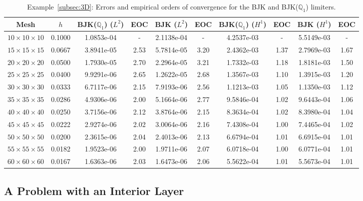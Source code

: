 \documentclass[a4paper]{article}
\theoremstyle{plain}
\theoremstyle{definition}
\theoremstyle{remark}
\begin{document}
\begin{table}[htbp]
	\centering
	\footnotesize
	\setlength{\tabcolsep}{3pt}
	\begin{tabular}{|c|c|c|c|c|c|c|c|c|c|}
		\hline
		Mesh & $h$ & BJK($ \mathbb{Q}_1 $) ($L^2$) & EOC & BJK ($L^2$) & EOC & BJK($ \mathbb{Q}_1 $) ($H^1$) & EOC & BJK ($H^1$) & EOC \\
		\hline
		$10\times10\times10$ & 0.1000 & 1.0853e-04 & -    & 2.1138e-04 & -    & 4.2537e-03 & -    & 5.5149e-03 & -    \\ \hline
		$15\times15\times15$ & 0.0667 & 3.8941e-05 & 2.53 & 5.7814e-05 & 3.20 & 2.4362e-03 & 1.37 & 2.7969e-03 & 1.67 \\ \hline
		$20\times20\times20$ & 0.0500 & 1.7930e-05 & 2.70 & 2.2964e-05 & 3.21 & 1.7332e-03 & 1.18 & 1.8181e-03 & 1.50 \\ \hline
		$25\times25\times25$ & 0.0400 & 9.9291e-06 & 2.65 & 1.2622e-05 & 2.68 & 1.3567e-03 & 1.10 & 1.3915e-03 & 1.20 \\ \hline
		$30\times30\times30$ & 0.0333 & 6.7117e-06 & 2.15 & 7.9193e-06 & 2.56 & 1.1213e-03 & 1.05 & 1.1350e-03 & 1.12 \\ \hline
		$35\times35\times35$ & 0.0286 & 4.9306e-06 & 2.00 & 5.1664e-06 & 2.77 & 9.5846e-04 & 1.02 & 9.6443e-04 & 1.06 \\ \hline
		$40\times40\times40$ & 0.0250 & 3.7156e-06 & 2.12 & 3.8764e-06 & 2.15 & 8.3634e-04 & 1.02 & 8.3980e-04 & 1.04 \\ \hline
		$45\times45\times45$ & 0.0222 & 2.9274e-06 & 2.02 & 3.0064e-06 & 2.16 & 7.4308e-04 & 1.00 & 7.4465e-04 & 1.02 \\ \hline
		$50\times50\times50$ & 0.0200 & 2.3615e-06 & 2.04 & 2.4013e-06 & 2.13 & 6.6794e-04 & 1.01 & 6.6915e-04 & 1.01 \\ \hline
		$55\times55\times55$ & 0.0182 & 1.9523e-06 & 2.00 & 1.9711e-06 & 2.07 & 6.0718e-04 & 1.00 & 6.0771e-04 & 1.01 \\ \hline
		$60\times60\times60$ & 0.0167 & 1.6363e-06 & 2.03 & 1.6473e-06 & 2.06 & 5.5622e-04 & 1.01 & 5.5673e-04 & 1.01 \\ \hline
	\end{tabular}
	\caption{Example~\ref{subsec:3D}: Errors and empirical orders of convergence for the
		BJK and BJK($\mathbb{Q}_1$) limiters.}
	\label{tab:3d_convergence}
\end{table}

\subsection{A Problem with an Interior Layer}\label{subsec:layer}
\end{document}
